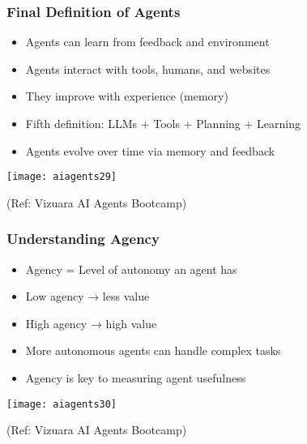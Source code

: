 \begin{frame}[fragile]\frametitle{Final Definition of Agents}

      \begin{itemize}
        \item Agents can learn from feedback and environment
        \item Agents interact with tools, humans, and websites
        \item They improve with experience (memory)
        \item Fifth definition: LLMs + Tools + Planning + Learning
        \item Agents evolve over time via memory and feedback
      \end{itemize}

		\begin{center}
		\texttt{[image: aiagents29]}
		
		{\tiny (Ref: Vizuara AI Agents Bootcamp)}
		\end{center}	

\end{frame}

\begin{frame}[fragile]\frametitle{Understanding Agency}

      \begin{itemize}
        \item Agency = Level of autonomy an agent has
        \item Low agency → less value
        \item High agency → high value
        \item More autonomous agents can handle complex tasks
        \item Agency is key to measuring agent usefulness
      \end{itemize}

		\begin{center}
		\texttt{[image: aiagents30]}
		
		{\tiny (Ref: Vizuara AI Agents Bootcamp)}
		\end{center}	

\end{frame}

